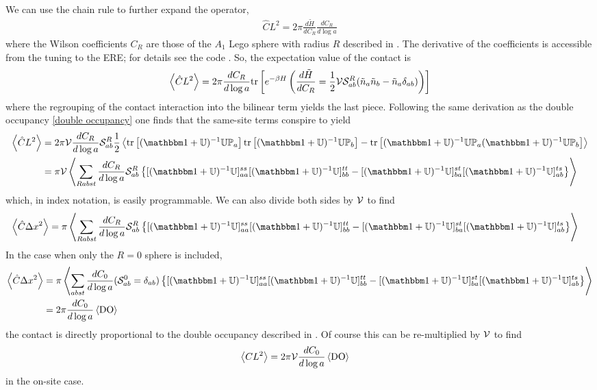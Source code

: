 We can use the chain rule to further expand the operator,
\begin{align}
    \hat{C}L^2 = 2\pi \frac{d\tilde{H}}{d C_R} \frac{d C_R}{d\log a} 
\end{align}
where the Wilson coefficients $C_R$ are those of the $A_1$ Lego sphere with radius $R$ described in .
The derivative of the coefficients is accessible from the tuning to the ERE; for details see the code .
So, the expectation value of the contact is
\begin{align}
    \left\langle \hat{C} L^2 \right\rangle
    = 2 \pi \frac{d C_R}{d\log a} \text{tr}\left[e^{-\beta H} \left(\frac{d\tilde{H}}{d C_R} = \frac{1}{2} \mathcal{V} \mathcal{S}^{R}_{ab} (\tilde{n}_a \tilde{n}_b - \tilde{n}_a \delta_{ab}) \right)\right]
    \label{eq:contact generic}
\end{align}
where the regrouping of the contact interaction into the bilinear term yields the last piece.
Following the same derivation as the double occupancy \eqref{double occupancy} one finds that the same-site terms conspire to yield
\begin{align}
    \expectation{\hat{C} L^2}
    &= 2 \pi \Volume \frac{d C_R}{d\log a} \LegoSphere{R}_{ab} \half\expectation{\tr{(\one + \UU)\inverse \UU \PP_a}\tr{(\one + \UU)\inverse \UU \PP_b} - \tr{(\one+\UU)\inverse \UU \PP_a (\one+\UU)\inverse \UU \PP_b}}
    \nonumber\\
    &= \pi\Volume \expectation{\sum_{Rabst} \frac{d C_R}{d\log a} \LegoSphere{R}_{ab} \left\{[(\one+\UU)\inverse \UU]^{ss}_{aa} [(\one+\UU)\inverse \UU]^{tt}_{bb} - [(\one+\UU)\inverse \UU]^{st}_{ba} [(\one+\UU)\inverse \UU]^{ts}_{ab} \right\}}
\end{align}
which, in index notation, is easily programmable.
We can also divide both sides by $\mathcal{V}$ to find
\begin{align}
    \expectation{\hat{C} \Delta x^2}
    &= \pi \expectation{\sum_{Rabst} \frac{d C_R}{d\log a} \LegoSphere{R}_{ab} \left\{[(\one+\UU)\inverse \UU]^{ss}_{aa} [(\one+\UU)\inverse \UU]^{tt}_{bb} - [(\one+\UU)\inverse \UU]^{st}_{ba} [(\one+\UU)\inverse \UU]^{ts}_{ab} \right\}}
\end{align}
In the case when only the $R=0$ sphere is included,
\begin{align}
    \expectation{\hat{C} \Delta x^2}
    &= \pi \expectation{\sum_{abst} \frac{d C_0}{d\log a} (\LegoSphere{0}_{ab} = \delta_{ab}) \left\{[(\one+\UU)\inverse \UU]^{ss}_{aa} [(\one+\UU)\inverse \UU]^{tt}_{bb} - [(\one+\UU)\inverse \UU]^{st}_{ba} [(\one+\UU)\inverse \UU]^{ts}_{ab} \right\}}
    \nonumber\\
    &= 2\pi \frac{d C_0}{d\log a} \expectation{ \DoubleOccupancy }
\end{align}
the contact is directly proportional to the double occupancy described in .
Of course this can be re-multiplied by $\mathcal{V}$ to find
\begin{align}
    \left\langle CL^2 \right\rangle
    &= 2\pi \mathcal{V} \frac{d C_0}{d\log a} \left\langle  \textrm{DO}  \right\rangle
\end{align}
in the on-site case.
